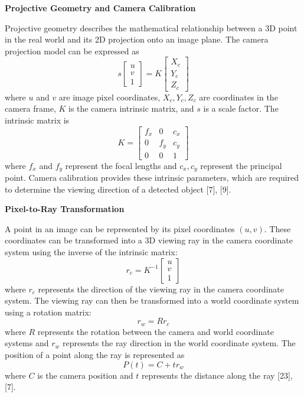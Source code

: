\documentclass[12pt]{article}
\newcommand{\infofont}{\fontsize{16pt}{19.2pt}\selectfont}
\begin{document}
\textbf{\infofont Projective Geometry and Camera Calibration}\par
\infofont
Projective geometry describes the mathematical relationship between a 3D point in the
real world and its 2D projection onto an image plane. The camera projection model can be
expressed as
\begin{equation}
s\begin{bmatrix} u \\ v \\ 1 \end{bmatrix} = K \begin{bmatrix} X_c \\ Y_c \\ Z_c \end{bmatrix}
\end{equation}
where $u$ and $v$ are image pixel coordinates, $X_c, Y_c, Z_c$ are coordinates in the camera
frame, $K$ is the camera intrinsic matrix, and $s$ is a scale factor. The intrinsic matrix is
\begin{equation}
K = \begin{bmatrix} f_x & 0 & c_x \\ 0 & f_y & c_y \\ 0 & 0 & 1 \end{bmatrix}
\end{equation}
where $f_x$ and $f_y$ represent the focal lengths and $c_x, c_y$ represent the principal point.
Camera calibration provides these intrinsic parameters, which are required to determine
the viewing direction of a detected object [7], [9].

\textbf{\infofont Pixel-to-Ray Transformation}\par
\infofont
A point in an image can be represented by its pixel coordinates $(u,v)$. These coordinates
can be transformed into a 3D viewing ray in the camera coordinate system using the inverse
of the intrinsic matrix:
\begin{equation}
r_c = K^{-1}\begin{bmatrix} u \\ v \\ 1 \end{bmatrix}
\end{equation}
where $r_c$ represents the direction of the viewing ray in the camera coordinate system.
The viewing ray can then be transformed into a world coordinate system using a rotation
matrix:
\begin{equation}
r_w = R r_c
\end{equation}
where $R$ represents the rotation between the camera and world coordinate systems and
$r_w$ represents the ray direction in the world coordinate system. The position of a point
along the ray is represented as
\begin{equation}
P(t) = C + t r_w
\end{equation}
where $C$ is the camera position and $t$ represents the distance along the ray [23], [7].
\end{document}
